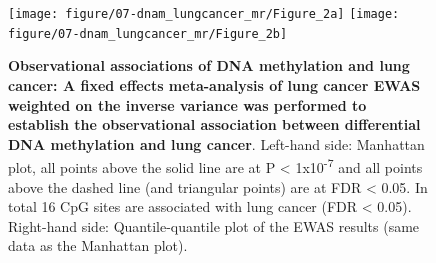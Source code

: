 \documentclass[11pt,oneside]{bristolthesis}
\newcommand{\blandscape}{\begin{landscape}}
\newcommand{\elandscape}{\end{landscape}}
\begin{document}
\blandscape
\begin{figure}[htbp]
\texttt{[image: figure/07-dnam\_lungcancer\_mr/Figure\_2a]} \texttt{[image: figure/07-dnam\_lungcancer\_mr/Figure\_2b]} \caption[Observational associations of DNA methylation and lung cancer: A fixed effects meta-analysis of lung cancer EWAS weighted on the inverse variance was performed to establish the observational association between differential DNA methylation and lung cancer]{\textbf{Observational associations of DNA methylation and lung cancer: A fixed effects meta-analysis of lung cancer EWAS weighted on the inverse variance was performed to establish the observational association between differential DNA methylation and lung cancer}. Left-hand side: Manhattan plot, all points above the solid line are at P \textless{} 1x10\textsuperscript{-7} and all points above the dashed line (and triangular points) are at FDR \textless{} 0.05. In total 16 CpG sites are associated with lung cancer (FDR \textless{} 0.05). Right-hand side: Quantile-quantile plot of the EWAS results (same data as the Manhattan plot).}\label{fig:fig2-07}
\end{figure}
\elandscape
\end{document}
